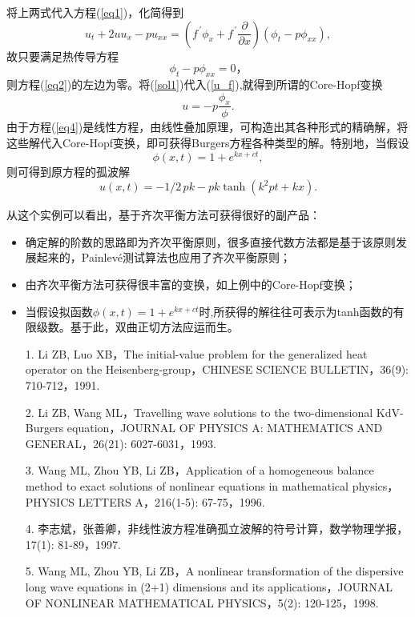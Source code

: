 \documentclass{beamer}
\begin{document}
\begin{frame}
将上两式代入方程(\ref{eq1})，化简得到
\begin{equation}\label{eq2}
u_t+2uu_x-pu_{xx}=(f^{\,'}\phi_x+f^{\,'}\frac{\partial}{\partial x})(\phi_t-p\phi_{xx}),
\end{equation}
故只要满足热传导方程
\begin{equation}\label{eq4}
  \phi_t-p\phi_{xx}=0，
\end{equation}
  则方程(\ref{eq2})的左边为零。将(\ref{sol1})代入(\ref{u_f}),就得到所谓的Core-Hopf变换
\[
  u=-p\dfrac{\phi_x}{\phi}.
\]
由于方程(\ref{eq4})是线性方程，由线性叠加原理，可构造出其各种形式的精确解，将这些解代入Core-Hopf变换，即可获得Burgers方程各种类型的解。特别地，当假设
\[
  \phi(x,t)=1+e^{kx+ct} ,
\]
则可得到原方程的孤波解
\[
  u \left( x,t \right) =-1/2\,pk-pk\tanh \left( {k}^{2}pt+kx \right).
\]
\end{frame}
\begin{frame}
从这个实例可以看出，基于齐次平衡方法可获得很好的副产品：
   \begin{itemize}
    \item 确定解的阶数的思路即为齐次平衡原则，很多直接代数方法都是基于该原则发展起来的，Painlev\'{e}测试算法也应用了齐次平衡原则；
    \item 由齐次平衡方法可获得很丰富的变换，如上例中的Core-Hopf变换；
    \item 当假设拟函数$\phi(x,t)=1+e^{kx+ct}$时,所获得的解往往可表示为tanh函数的有限级数。基于此，双曲正切方法应运而生。 
   \end{itemize}
\end{frame}
\begin{frame}
  \begin{itemize}
    \item[1.] Li ZB, Luo XB，The initial-value problem for the generalized heat operator on the Heisenberg-group，CHINESE SCIENCE BULLETIN，36(9): 710-712，1991.
    \item[2.] Li ZB, Wang ML，Travelling wave solutions to the two-dimensional KdV-Burgers equation，JOURNAL OF PHYSICS A: MATHEMATICS AND GENERAL，26(21): 6027-6031，1993.
    \item[3.] Wang ML, Zhou YB, Li ZB，Application of a homogeneous balance method to exact solutions of nonlinear equations in mathematical physics，PHYSICS LETTERS A，216(1-5): 67-75，1996.
    \item [4.]李志斌，张善卿，非线性波方程准确孤立波解的符号计算，数学物理学报，17(1): 81-89，1997.
    \item[5.] Wang ML, Zhou YB, Li ZB，A nonlinear transformation of the dispersive long wave equations in (2+1) dimensions and its applications，JOURNAL OF NONLINEAR MATHEMATICAL PHYSICS，5(2): 120-125，1998.
  \end{itemize}
\end{frame}
\end{document}
